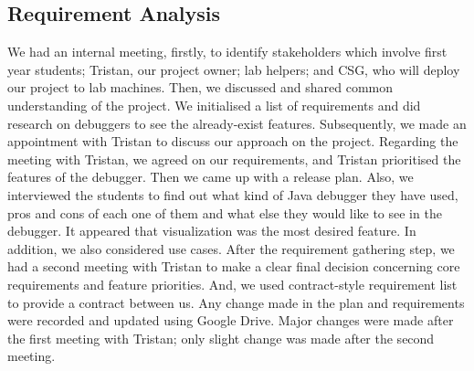 \documentclass[11pt]{article}
\begin{document}
\subsection{Requirement Analysis}
We had an internal meeting, firstly, to identify stakeholders which involve first year students; Tristan, our project owner; lab helpers; and CSG, who will deploy our project to lab machines. Then, we discussed and shared common understanding of the project. We initialised a list of requirements and did research on debuggers to see the already-exist features. Subsequently, we made an appointment with Tristan to discuss our approach on the project. Regarding the meeting with Tristan, we agreed on our requirements, and Tristan prioritised the features of the debugger. Then we came up with a release plan. Also, we interviewed the students to find out what kind of Java debugger they have used, pros and cons of each one of them and what else they would like to see in the debugger. It appeared that visualization was the most desired feature. In addition, we also considered use cases. After the requirement gathering step, we had a second meeting with Tristan to make a clear final decision concerning core requirements and feature priorities. And, we used contract-style requirement list to provide a contract between us.
Any change made in the plan and requirements were recorded and updated using Google Drive. Major changes were made after the first meeting with Tristan; only slight change was made after the second meeting. 
\end{document}
